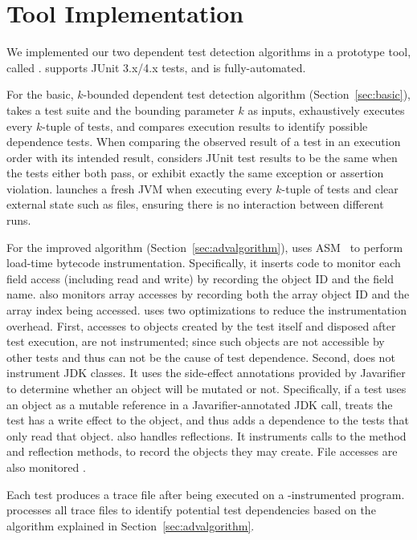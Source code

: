 \section{Tool Implementation}
\label{sec:impl}


We implemented our two dependent test detection algorithms in
a prototype tool, called \ourtool. \ourtool
supports JUnit 3.x/4.x tests, and is fully-automated.

For the basic, $k$-bounded dependent test detection algorithm
(Section~\ref{sec:basic}), \ourtool takes a test suite
and the bounding parameter $k$ as inputs, 
exhaustively executes every $k$-tuple
of tests, and compares execution results to identify possible
dependence tests. When
comparing the observed result of a test in an execution order with
its intended result,
\ourtool considers JUnit test results to be the same when the
tests either both pass, or exhibit exactly the same exception
or assertion violation.
\ourtool launches a fresh JVM when executing every
$k$-tuple of tests and clear external state such
as files, ensuring there is no interaction between
different runs. 

For the improved algorithm (Section~\ref{sec:advalgorithm}),
\ourtool uses ASM~\cite{asm} to perform load-time bytecode
instrumentation. Specifically, it inserts code to monitor each
field access (including read and write) by recording the
object ID and the field name.
\ourtool also monitors array accesses by recording
both the array object ID and the array index being accessed.
\ourtool uses two optimizations to reduce the
instrumentation overhead. First, accesses to objects
created by the test itself and disposed
after test execution, are not instrumented; since such 
objects are not accessible by other tests and thus can not
be the cause of test dependence. Second,
\ourtool does not instrument JDK classes. It uses the side-effect
annotations provided by Javarifier~\cite{QuinonezTE2008} to 
determine whether an object will be mutated or not.
Specifically, if a test uses an object as a mutable reference
in a Javarifier-annotated JDK call, \ourtool treats the test
has a write effect to the object, and thus adds a dependence
to the tests that only read that object. 
\ourtool also handles reflections. It instruments
calls to the  method and reflection
methods, to record the objects they may create.
File accesses are also monitored .

Each test produces a trace file after being
executed on a \ourtool-instrumented program. \ourtool
processes all trace files to identify potential
test dependencies based on the algorithm explained in
Section~\ref{sec:advalgorithm}.

